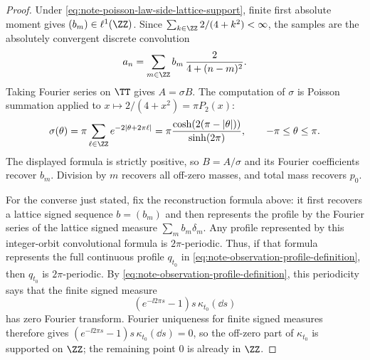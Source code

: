 \begin{proof}
Under \eqref{eq:note-poisson-law-side-lattice-support}, finite first absolute
moment gives \((b_m)\in\ell^1(\ZZ)\).  Since
\(\sum_{k\in\ZZ}2/(4+k^2)<\infty\), the samples are the absolutely convergent
discrete convolution
\[
a_n=\sum_{m\in\ZZ}b_m\,\frac{2}{4+(n-m)^2}.
\]
Taking Fourier series on \(\TT\) gives \(A=\sigma B\).  The computation of
\(\sigma\) is Poisson summation applied to \(x\mapsto2/(4+x^2)=\pi P_2(x)\):
\[
\sigma(\theta)
=\pi\sum_{\ell\in\ZZ}e^{-2|\theta+2\pi\ell|}
=\pi\frac{\cosh(2(\pi-|\theta|))}{\sinh(2\pi)},
\qquad -\pi\le\theta\le\pi.
\]
The displayed formula is strictly positive, so \(B=A/\sigma\) and its Fourier
coefficients recover \(b_m\).  Division by \(m\) recovers all off-zero masses,
and total mass recovers \(p_0\).

For the converse just stated, fix the reconstruction formula above: it first
recovers a lattice signed sequence \(b=(b_m)\) and then represents the profile
by the Fourier series of the lattice signed measure \(\sum_m b_m\delta_m\).
Any profile represented by this integer-orbit convolutional formula is
\(2\pi\)-periodic.  Thus, if that formula represents the full continuous
profile \(q_{t_0}\) in \eqref{eq:note-observation-profile-definition}, then
\(q_{t_0}\) is \(2\pi\)-periodic.  By
\eqref{eq:note-observation-profile-definition}, this periodicity says that the
finite signed measure
\[
(e^{-\ii2\pi s}-1)s\,\kappa_{t_0}(\dd s)
\]
has zero Fourier transform.  Fourier uniqueness for finite signed measures
therefore gives
\((e^{-\ii2\pi s}-1)s\,\kappa_{t_0}(\dd s)=0\), so the off-zero part of
\(\kappa_{t_0}\) is supported on \(\ZZ\); the remaining point \(0\) is already in
\(\ZZ\).
\end{proof}

